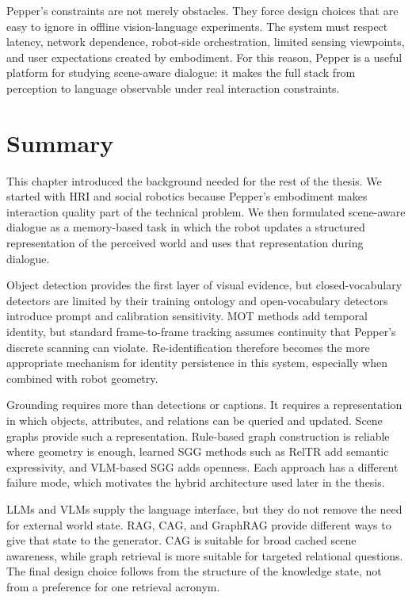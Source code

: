 Pepper's constraints are not merely obstacles. They force design choices that are easy to ignore in offline vision-language experiments. The system must respect latency, network dependence, robot-side orchestration, limited sensing viewpoints, and user expectations created by embodiment. For this reason, Pepper is a useful platform for studying scene-aware dialogue: it makes the full stack from perception to language observable under real interaction constraints.

\section{Summary}\label{sec:background-summary}

This chapter introduced the background needed for the rest of the thesis. We started with HRI and social robotics because Pepper's embodiment makes interaction quality part of the technical problem. We then formulated scene-aware dialogue as a memory-based task in which the robot updates a structured representation of the perceived world and uses that representation during dialogue.

Object detection provides the first layer of visual evidence, but closed-vocabulary detectors are limited by their training ontology and open-vocabulary detectors introduce prompt and calibration sensitivity. MOT methods add temporal identity, but standard frame-to-frame tracking assumes continuity that Pepper's discrete scanning can violate. Re-identification therefore becomes the more appropriate mechanism for identity persistence in this system, especially when combined with robot geometry.

Grounding requires more than detections or captions. It requires a representation in which objects, attributes, and relations can be queried and updated. Scene graphs provide such a representation. Rule-based graph construction is reliable where geometry is enough, learned SGG methods such as RelTR add semantic expressivity, and VLM-based SGG adds openness. Each approach has a different failure mode, which motivates the hybrid architecture used later in the thesis.

LLMs and VLMs supply the language interface, but they do not remove the need for external world state. RAG, CAG, and GraphRAG provide different ways to give that state to the generator. CAG is suitable for broad cached scene awareness, while graph retrieval is more suitable for targeted relational questions. The final design choice follows from the structure of the knowledge state, not from a preference for one retrieval acronym.

